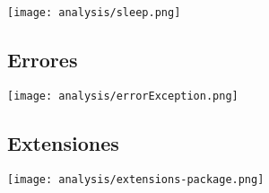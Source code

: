 \begin{center}
\texttt{[image: analysis/sleep.png]} 
\end{center}


\subsection {Errores} 
\begin{center}
\texttt{[image: analysis/errorException.png]} 
\end{center}




\subsection {Extensiones} 
\begin{center}
\texttt{[image: analysis/extensions-package.png]} 
\end{center}

